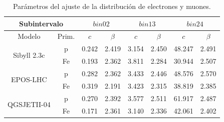 \documentclass[11pt,table,compress]{beamer}
\begin{document}
	\begin{frame}
	\begin{footnotesize}
	
		\begin{table}[] 
		\centering
		\caption{Parámetros del ajuste de la distribución de electrones y muones.}	
		\begin{tabular}{cc|cc|cc|cc}
		\hline
		\multicolumn{2}{c|}{Subintervalo}                          & \multicolumn{2}{c|}{$bin02$} & \multicolumn{2}{c|}{$bin13$} & \multicolumn{2}{c}{$bin24$} \\ \hline
		\multicolumn{1}{c|}{Modelo}                       & Prim. & $c$          & $\beta$       & $c$          & $\beta$       & $c$          & $\beta$       \\ \hline
		\multicolumn{1}{c|}{\multirow{2}{*}{Sibyll 2.3c}} & p     & 0.242        & 2.419         & 3.154        & 2.450         & 48.247       & 2.491         \\
		\multicolumn{1}{c|}{}                             & Fe    & 0.193        & 2.362         & 3.811        & 2.284         & 30.944       & 2.507         \\ \hline
		\multicolumn{1}{c|}{\multirow{2}{*}{EPOS-LHC}}    & p     & 0.282        & 2.362         & 3.433        & 2.446         & 48.576       & 2.570         \\
		\multicolumn{1}{c|}{}                             & Fe    & 0.319        & 2.191         & 3.423        & 2.315         & 38.819       & 2.385         \\ \hline
		\multicolumn{1}{c|}{\multirow{2}{*}{QGSJETII-04}} & p     & 0.270        & 2.392         & 3.577        & 2.511         & 61.917       & 2.487         \\
		\multicolumn{1}{c|}{}                             & Fe    & 0.171        & 2.361         & 3.140        & 2.336         & 42.061       & 2.402         \\ \hline
		

\end{tabular}
\end{table}
\end{footnotesize}
\end{frame}
\end{document}
